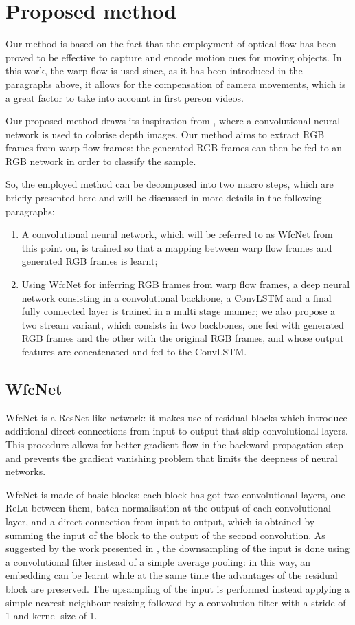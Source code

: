 \documentclass[10pt,twocolumn,letterpaper]{article}
\begin{document}
\section{Proposed method}
Our method is based on the fact that the employment of optical flow has been proved to be effective to capture and encode motion cues for moving objects. In this work, the warp flow is used since, as it has been introduced in the paragraphs above, it allows for the compensation of camera movements, which is a great factor to take into account in first person videos.

Our proposed method draws its inspiration from \cite{carlucci2017de2}, where a convolutional neural network is used to colorise depth images. Our method aims to extract RGB frames from warp flow frames: the generated RGB frames can then be fed to an RGB network in order to classify the sample.

So, the employed method can be decomposed into two macro steps, which are briefly presented here and will be discussed in more details in the following paragraphs:
\begin{enumerate}
	\item A convolutional neural network, which will be referred to as WfcNet from this point on, is trained so that a mapping between warp flow frames and generated RGB frames is learnt; 
	\item Using WfcNet for inferring RGB frames from warp flow frames, a deep neural network consisting in a convolutional backbone, a ConvLSTM and a final fully connected layer is trained in a multi stage manner; we also propose a two stream variant, which consists in two backbones, one fed with generated RGB frames and the other with the original RGB frames, and whose output features are concatenated and fed to the ConvLSTM.
\end{enumerate}

\subsection{WfcNet}
WfcNet is a ResNet like network: it makes use of residual blocks which introduce additional direct connections from input to output that skip convolutional layers. This procedure allows for better gradient flow in the backward propagation step and prevents the gradient vanishing problem that limits the deepness of neural networks.

WfcNet is made of basic blocks: each block has got two convolutional layers, one ReLu between them, batch normalisation at the output of each convolutional
layer, and a direct connection from input to output, which is obtained by summing the input of the block to the output of the second convolution.
As suggested by the work presented in \cite{springenberg2014striving}, the downsampling of the input is done using a convolutional filter instead of a simple average pooling: in this way, an embedding can be learnt while at the same time the advantages of the residual block are preserved.
The upsampling of the input is performed instead applying a simple nearest neighbour resizing followed by a convolution filter with a stride of 1 and kernel size of 1.
\end{document}
